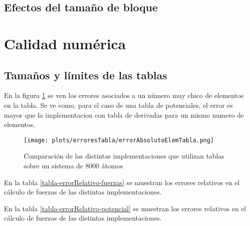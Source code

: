 \subsection{Efectos del tamaño de bloque}


\section{Calidad numérica}

\subsection{Tamaños y límites de las tablas}
En la figura \ref{errorAbsElemTabla} se ven los errores asociados a un número muy chico de elementos en la tabla. 
Se ve como, para el caso de una tabla de potenciales, el error es mayor que la implementacion con tabla de derivadas
para un mismo numero de elementos.

\begin{figure}[htbp]
\centering
   \texttt{[image: plots/erroresTabla/errorAbsolutoElemTabla.png]}
 \caption{Comparaci\'on de las distintas implementaciones que utilizan tablas sobre un sistema de 8000 átomos }
 \label{errorAbsElemTabla}
\end{figure}





En la tabla \ref{tabla-errorRelativo-fuerzas} se muestran los errores relativos en el cálculo de fuerzas de las distintas implementaciones.



En la tabla \ref{tabla-errorRelativo-potencial} se muestran los errores relativos en el cálculo de fuerzas de las distintas implementaciones.





